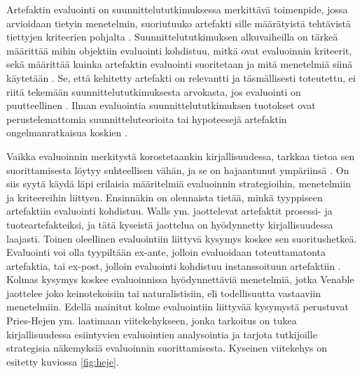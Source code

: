\documentclass[utf8]{gradu3}
\begin{document}
Artefaktin evaluointi on suunnittelututkimuksessa merkittävä toimenpide, jossa arvioidaan tietyin menetelmin, suoriutuuko artefakti sille määrätyistä tehtävistä tiettyjen kriteerien pohjalta \parencite{smith}. Suunnittelututkimuksen alkuvaiheilla on tärkeä määrittää mihin objektiin evaluointi kohdistuu, mitkä ovat evaluoinnin kriteerit, sekä määrittää kuinka artefaktin evaluointi suoritetaan ja mitä menetelmiä siinä käytetään \parencite{evaluation}. Se, että kehitetty artefakti on relevantti ja täsmällisesti toteutettu, ei riitä tekemään suunnittelututkimuksesta arvokasta, jos evaluointi on puutteellinen \parencite{cycles}. Ilman evaluointia suunnittelututkimuksen tuotokset ovat perustelemattomia suunnitteluteorioita tai hypoteesejä artefaktin ongelmanratkaisua koskien \parencite{comprehensive}. 

Vaikka evaluoinnin merkitystä korostetaankin kirjallisuudessa, tarkkaa tietoa sen suorittamisesta löytyy suhteellisen vähän, ja se on hajaantunut ympäriinsä \parencite{pries, comprehensive, evaluation}. On siis syytä käydä läpi erilaisia määritelmiä evaluoinnin strategioihin, menetelmiin ja kriteereihin liittyen. Ensinnäkin on olennaista tietää, minkä tyyppiseen artefaktiin evaluointi kohdistuu. Walls ym. \parencite*{walls} jaottelevat artefaktit prosessi- ja tuoteartefakteiksi, ja tätä kyseistä jaottelua on hyödynnetty kirjallisuudessa laajasti. Toinen oleellinen evaluointiin liittyvä kysymys koskee sen suoritushetkeä. Evaluointi voi olla tyypiltään ex-ante, jolloin evaluoidaan toteuttamatonta artefaktia, tai ex-post, jolloin evaluointi kohdistuu instanssoituun artefaktiin \parencite{pries}. Kolmas kysymys koskee evaluoinnissa hyödynnettäviä menetelmiä, jotka Venable \parencite*{venable} jaottelee joko keinotekoisiin tai naturalistisiin, eli todellisuutta vastaaviin menetelmiin. Edellä mainitut kolme evaluointiin liittyvää kysymystä perustuvat Pries-Hejen ym. \parencite*{pries} laatimaan viitekehykseen, jonka tarkoitus on tukea kirjallisuudessa esiintyvien evaluointien analysointia ja tarjota tutkijoille strategisia näkemyksiä evaluoinnin suorittamisesta. Kyseinen viitekehys on esitetty kuviossa \ref{fig:heje}.
\end{document}
